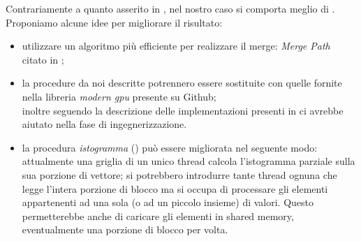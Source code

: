 Contrariamente a quanto asserito in \cite{parallelTrans}, nel nostro caso \ScanTrans{} si comporta meglio di \MergeTrans{}. Proponiamo alcune idee per migliorare il risultato:
\begin{itemize}
	\item utilizzare un algoritmo più efficiente per realizzare il merge: \textit{Merge Path} citato in \cite{merge};
	\item la procedure da noi descritte potrennero essere sostituite con quelle fornite nella libreria \textit{modern gpu} presente su Github; \\ inoltre seguendo la descrizione delle implementazioni presenti in \cite{moderngpu} ci avrebbe aiutato nella fase di ingegnerizzazione.
	\item la procedura \emph{istogramma} () può essere migliorata nel seguente modo: attualmente una griglia di un unico thread calcola l'istogramma parziale sulla sua porzione di vettore; si potrebbero introdurre tante thread ognuna che legge l'intera porzione di blocco ma si occupa di processare gli elementi appartenenti ad una sola (o ad un piccolo insieme) di valori. Questo permetterebbe anche di caricare gli elementi in shared memory, eventualmente una porzione di blocco per volta.
\end{itemize}

